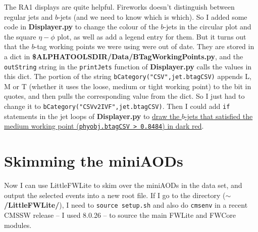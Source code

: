 The RA1 displays are quite helpful. Fireworks doesn't distinguish between regular jets and $b$-jets (and we need to know which is which). So I added some code in \textbf{Displayer.py} to change the colour of the $b$-jets in the circular plot and the square $\eta-\phi$ plot, as well as add a legend entry for them. But it turns out that the $b$-tag working points we were using were out of date. They are stored in a dict in \textbf{\$ALPHATOOLSDIR/Data/BTagWorkingPoints.py}, and the \texttt{outString} string in the \texttt{printJets} function of \textbf{Displayer.py} calls the values in this dict. The portion of the string \texttt{bCategory("CSV",jet.btagCSV)} appends L, M or T (whether it uses the loose, medium or tight working point) to the bit in quotes, and then pulls the corresponding value from the dict. So I just had to change it to \texttt{bCategory("CSVv2IVF",jet.btagCSV)}. Then I could add \texttt{if} statements in the jet loops of \textbf{Displayer.py} to \uline{draw the $b$-jets that satisfied the medium working point (\texttt{phyobj.btagCSV > 0.8484}) in dark red}.


\section{Skimming the miniAODs}

Now I can use LittleFWLite to skim over the miniAODs in the data set, and output the selected events into a new root file. If I go to the directory (\textbf{$\sim$/LittleFWLite/}), I need to \texttt{source setup.sh} and also do \texttt{cmsenv} in a recent CMSSW release -- I used 8.0.26 -- to source the main FWLite and FWCore modules.


